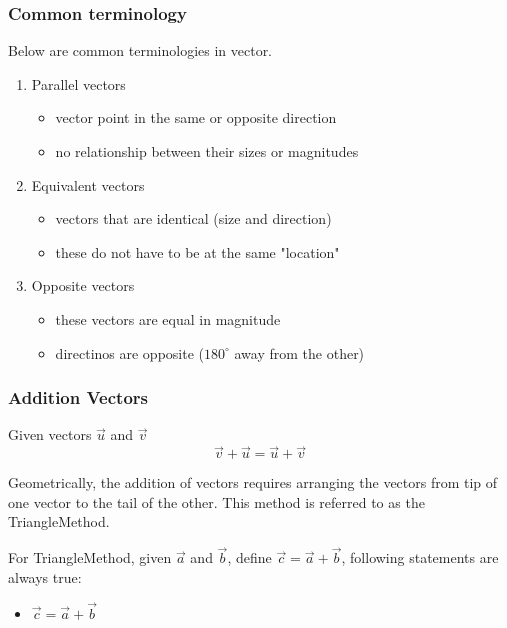 \subsubsection{Common terminology}
Below are common terminologies in vector. 
\begin{enumerate}
    \item Parallel vectors 
    \begin{itemize}
        \item vector point in the same or opposite direction 
        \item no relationship between their sizes or magnitudes
    \end{itemize}
    \item Equivalent vectors 
    \begin{itemize}
        \item vectors that are identical (size and direction)
        \item these do not have to be at the same "location"
    \end{itemize}
    \item Opposite vectors 
    \begin{itemize}
        \item these vectors are equal in magnitude 
        \item directinos are opposite ($180^{\circ}$ away from the other)
    \end{itemize}
\end{enumerate}

\subsubsection{Addition Vectors}
\begin{theorem}
    Given vectors $\vec{u}$ and $\vec{v}$ $$\vec{v} + \vec{u} = \vec{u} + \vec{v}$$
\end{theorem}

Geometrically, the addition of vectors requires arranging the vectors from tip of one vector to the tail of the other. 
This method is referred to as the TriangleMethod.

For TriangleMethod, given $\vec{a}$ and $\vec{b}$, define $\vec{c} = \vec{a} + \vec{b}$, following statements are always true:
\begin{itemize}
    \item $\vec{c} = \vec{a} + \vec{b}$
\end{itemize}


